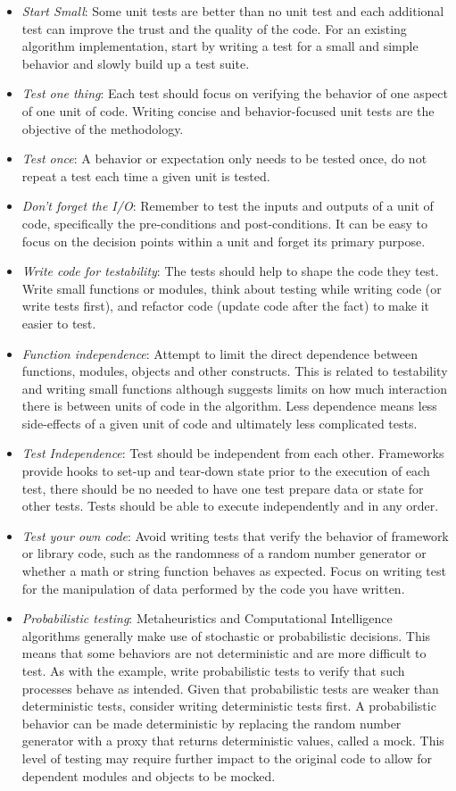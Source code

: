 \begin{itemize}
 	\item \emph{Start Small}: Some unit tests are better than no unit test and each additional test can improve the trust and the quality of the code. For an existing algorithm implementation, start by writing a test for a small and simple behavior and slowly build up a test suite.
  \item \emph{Test one thing}: Each test should focus on verifying the behavior of one aspect of one unit of code. Writing concise and behavior-focused unit tests are the objective of the methodology.
  \item \emph{Test once}: A behavior or expectation only needs to be tested once, do not repeat a test each time a given unit is tested.
  \item \emph{Don't forget the I/O}: Remember to test the inputs and outputs of a unit of code, specifically the pre-conditions and post-conditions. It can be easy to focus on the decision points within a unit and forget its primary purpose.
	\item \emph{Write code for testability}: The tests should help to shape the code they test. Write small functions or modules, think about testing while writing code (or write tests first), and refactor code (update code after the fact) to make it easier to test.
	\item \emph{Function independence}: Attempt to limit the direct dependence between functions, modules, objects and other constructs. This is related to testability and writing small functions although suggests limits on how much interaction there is between units of code in the algorithm. Less dependence means less side-effects of a given unit of code and ultimately less complicated tests.
  \item \emph{Test Independence}: Test should be independent from each other. Frameworks provide hooks to set-up and tear-down state prior to the execution of each test, there should be no needed to have one test prepare data or state for other tests. Tests should be able to execute independently and in any order.
	\item \emph{Test your own code}: Avoid writing tests that verify the behavior of framework or library code, such as the randomness of a random number generator or whether a math or string function behaves as expected. Focus on writing test for the manipulation of data performed by the code you have written.
	\item \emph{Probabilistic testing}: Metaheuristics and Computational Intelligence algorithms generally make use of stochastic or probabilistic decisions. This means that some behaviors are not deterministic and are more difficult to test. As with the example, write probabilistic tests to verify that such processes behave as intended. Given that probabilistic tests are weaker than deterministic tests, consider writing deterministic tests first. A probabilistic behavior can be made deterministic by replacing the random number generator with a proxy that returns deterministic values, called a mock. This level of testing may require further impact to the original code to allow for dependent modules and objects to be mocked.

\end{itemize}
